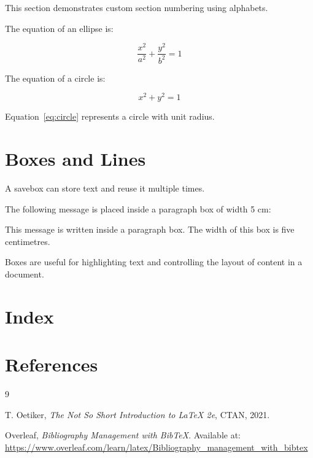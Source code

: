 \documentclass[12pt,a4paper]{article}
\begin{document}
	This section demonstrates custom section numbering using alphabets.
	
	The equation of an ellipse is:
	
	\begin{equation*}
		\frac{x^2}{a^2}+\frac{y^2}{b^2}=1
	\end{equation*}
	
	The equation of a circle is:
	
	\begin{equation}
		x^2+y^2=1
		\label{eq:circle}
	\end{equation}
	
	Equation~\ref{eq:circle} represents a circle with unit radius.
	
	\section{Boxes and Lines}
	
	A savebox can store text and reuse it multiple times.
	
	\newsavebox{\mybox}
	
	\noindent\usebox{\mybox}
	
	\noindent\usebox{\mybox}
	
	\noindent\usebox{\mybox}
	
	\vspace{0.5cm}
	
	The following message is placed inside a paragraph box of width 5 cm:
	
	\noindent
	\parbox{5cm}{
		This message is written inside a paragraph box. The width of this box is five centimetres.
	}
	
	\vspace{0.5cm}
	
	Boxes are useful for highlighting text and controlling the layout of content in a document.
	
	
	\newpage
	
	\section*{Index}
	\printindex
	
	\newpage
	
	\section*{References}
	
	\begin{thebibliography}{9}
		
		T. Oetiker,
		\textit{The Not So Short Introduction to LaTeX 2e},
		CTAN, 2021.
		
		Overleaf,
		\textit{Bibliography Management with BibTeX}.
		Available at:
		\url{https://www.overleaf.com/learn/latex/Bibliography_management_with_bibtex}
		
	\end{thebibliography}
	
\end{document}

